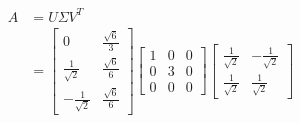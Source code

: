 \documentclass[11pt]{article} %
\begin{document}
\begin{enumerate}
\begin{itemize}
\begin{align*}
	A&=U\Sigma V^{T}\\
	&=\begin{bmatrix}
		0&\frac{\sqrt{6}}{3}\\
		\frac{1}{\sqrt{2}}& \frac{\sqrt{6}}{6}\\
		-\frac{1}{\sqrt{2}}&\frac{\sqrt{6}}{6}
	\end{bmatrix}\begin{bmatrix}
	1&0&0\\
	0&3&0\\
	0&0&0
\end{bmatrix}\begin{bmatrix}
\frac{1}{\sqrt{2}}&-\frac{1}{\sqrt{2}}\\
\frac{1}{\sqrt{2}}&\frac{1}{\sqrt{2}}
\end{bmatrix}
\end{align*}
\end{itemize}




\end{enumerate}

	
	
	
	
	
	
	
	
	
	
	
	
	
	
	
	
	
	
	
	
	
	
	
	
	
	
	
	
	
	
	
	
	
	
	
	
	
	
	
	
	
	
	
	
	
	
	
	
	
	
	
	
	
	
	
	
	
	
	
	
	
	
	
	
	
	
	
	
	
	
	
	
	
	
	
	
	
	
	
\end{document}

